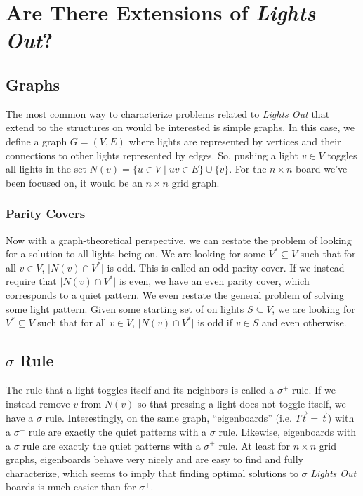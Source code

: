 \documentclass[a4paper]{article}
\begin{document}
	\section{Are There Extensions of \textit{Lights Out}?}
	\subsection{Graphs}
	The most common way to characterize problems related to \textit{Lights Out} that extend to the structures on would be interested is simple graphs.
	In this case, we define a graph $G = (V,E)$ where lights are represented by vertices and their connections to other lights represented by edges.
	So, pushing a light $v \in V$ toggles all lights in the set $N(v) = \{u \in V \mid uv \in E\} \cup \{v\}$.
	For the $n \times n$ board we've been focused on, it would be an $n \times n$ grid graph.
	
	\subsubsection{Parity Covers}
	Now with a graph-theoretical perspective, we can restate the problem of looking for a solution to all lights being on.
	We are looking for some $V^* \subseteq V$ such that for all $v \in V$, $\lvert N(v) \cap V^* \rvert$ is odd.
	This is called an odd parity cover.
	If we instead require that $\lvert N(v) \cap V^* \rvert$ is even, we have an even parity cover, which corresponds to a quiet pattern.
	We even restate the general problem of solving some light pattern.
	Given some starting set of on lights $S \subseteq V$, we are looking for $V^* \subseteq V$ such that for all $v \in V$, $\lvert N(v) \cap V^* \rvert$ is odd if $v \in S$ and even otherwise.
	
	\subsection{$\sigma$ Rule}
	The rule that a light toggles itself and its neighbors is called a $\sigma^+$ rule.
	If we instead remove $v$ from $N(v)$ so that pressing a light does not toggle itself, we have a $\sigma$ rule.
	Interestingly, on the same graph, ``eigenboards'' (i.e. $T\vec{t} = \vec{t}$) with a $\sigma^+$ rule are exactly the quiet patterns with a $\sigma$ rule.
	Likewise, eigenboards with a $\sigma$ rule are exactly the quiet patterns with a $\sigma^+$ rule.
	At least for $n \times n$ grid graphs, eigenboards behave very nicely and are easy to find and fully characterize, which seems to imply that finding optimal solutions to $\sigma$ \textit{Lights Out} boards is much easier than for $\sigma^+$.
	
\end{document}
